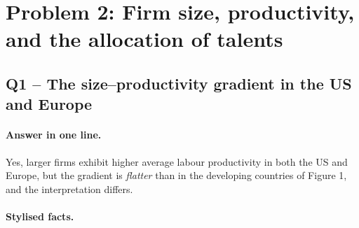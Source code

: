 \documentclass[11pt,a4paper]{article}
\begin{document}
\section*{Problem 2: Firm size, productivity, and the allocation of talents}

\subsection*{Q1 -- The size--productivity gradient in the US and Europe}

\paragraph{Answer in one line.} Yes, larger firms exhibit higher average labour productivity in both the US and Europe, but the gradient is \emph{flatter} than in the developing countries of Figure 1, and the interpretation differs.

\paragraph{Stylised facts.}
\end{document}

